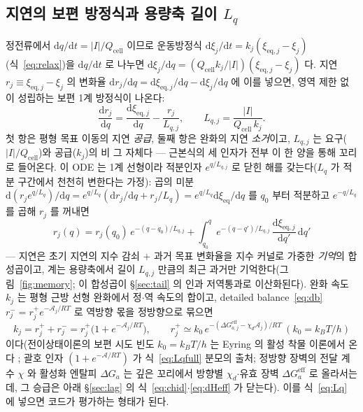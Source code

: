 \documentclass[11pt,a4paper]{article}
\newcommand{\dd}{\mathrm{d}}
\newcommand{\eff}{\mathrm{eff}}
\newcommand{\eq}{\mathrm{eq}}
\newcommand{\cell}{\mathrm{cell}}
\begin{document}
\subsection{지연의 보편 방정식과 용량축 길이 $L_q$}
정전류에서 $\dd q/\dd t=|I|/Q_\cell$ 이므로 운동방정식 $\dd\xi_j/\dd t=k_j(\xi_{\eq,j}-\xi_j)$(식~\eqref{eq:relax})을
$\dd q/\dd t$ 로 나누면 $\dd\xi_j/\dd q=(Q_\cell k_j/|I|)(\xi_{\eq,j}-\xi_j)$ 다. 지연 $r_j\equiv\xi_{\eq,j}-\xi_j$ 의
변화율 $\dd r_j/\dd q=\dd\xi_{\eq,j}/\dd q-\dd\xi_j/\dd q$ 에 이를 넣으면, 영역 제한 없이 성립하는 보편 1계 방정식이
나온다:
\begin{equation}
\frac{\dd r_j}{\dd q}=\frac{\dd\xi_{\eq,j}}{\dd q}-\frac{r_j}{L_{q,j}},
\qquad L_{q,j}=\frac{|I|}{Q_\cell\,k_j}.
\label{eq:Lq}
\end{equation}
첫 항은 평형 목표 이동의 지연 \emph{공급}, 둘째 항은 완화의 지연 \emph{소거}이고, $L_{q,j}$ 는 요구($|I|/Q_\cell$)와
공급($k_j$)의 비 그 자체다 --- 근본식의 세 인자가 전부 이 한 양을 통해 꼬리로 들어온다. 이 ODE 는 1계 선형이라
적분인자 $e^{q/L_{q,j}}$ 로 닫힌 해를 갖는다($L_q$ 가 적분 구간에서 천천히 변한다는 가정): 곱의 미분
$\dd(r_je^{q/L_q})/\dd q=e^{q/L_q}(\dd r_j/\dd q+r_j/L_q)=e^{q/L_q}\dd\xi_\eq/\dd q$ 를 $q_0$ 부터 적분하고
$e^{-q/L_q}$ 를 곱해 $r_j$ 를 꺼내면
\begin{equation}
r_j(q)=r_j(q_0)\,e^{-(q-q_0)/L_{q,j}}
+\int_{q_0}^{q}e^{-(q-q')/L_{q,j}}\,\frac{\dd\xi_{\eq,j}}{\dd q'}\,\dd q'
\label{eq:memory}
\end{equation}
--- 지연은 초기 지연의 지수 감쇠 $+$ 과거 목표 변화율을 지수 커널로 가중한 \emph{기억}의 합성곱이고, 계는 용량축에서
길이 $L_{q,j}$ 만큼의 최근 과거만 기억한다(그림~\ref{fig:memory}; 이 합성곱이 \S\ref{sec:tail} 의 인과 저역통과로
이산화된다). 완화 속도 $k_j$ 는 평형 근방 선형 완화에서 정$\cdot$역 속도의 합이고, detailed balance~\eqref{eq:db}
$r_j^-=r_j^+e^{-\mathcal A_j/RT}$ 로 역방향 몫을 정방향으로 묶으면
\begin{equation}
k_j=r_j^++r_j^-=r_j^+\big(1+e^{-\mathcal A_j/RT}\big),\qquad
r_j^+\simeq k_0\,e^{-(\Delta G_{a,j}^\eff-\chi_d\mathcal A_j)/RT}\ (k_0=k_BT/h)
\label{eq:kuniv}
\end{equation}
이다(전이상태이론의 보편 시도 빈도 $k_0=k_BT/h$ 는 Eyring 의 활성 착물 이론에서 온다 \cite{eyring1935}; 괄호 인자
$(1+e^{-\mathcal A/RT})$ 가 식~\eqref{eq:Lqfull} 분모의 출처; 정방향 장벽의 전달 계수 $\chi$ 와 활성화
엔탈피 $\Delta G_a$ 는 깊은 꼬리에서 방향별 $\chi_d$$\cdot$유효 장벽 $\Delta G_a^\eff$ 로 올라서는데, 그 승급은 아래
\S\ref{sec:lag} 의 식~\eqref{eq:chid}$\cdot$\eqref{eq:dHeff} 가 닫는다). 이를 식~\eqref{eq:Lq} 에 넣으면 코드가
평가하는 형태가 된다.
\end{document}

